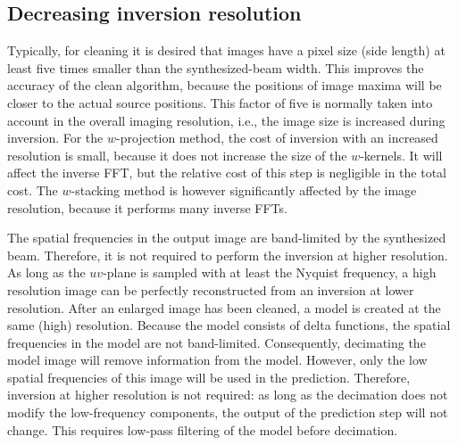 \documentclass[useAMS,usenatbib]{mn2e}
\begin{document}
\subsection{Decreasing inversion resolution} \label{sec:decreasing-inversion-resolution}
Typically, for cleaning it is desired that images have a pixel size (side length) at least five times smaller than the synthesized-beam width. This improves the accuracy of the clean algorithm, because the positions of image maxima will be closer to the actual source positions. This factor of five is normally taken into account in the overall imaging resolution, i.e., the image size is increased during inversion. For the $w$-projection method, the cost of inversion with an increased resolution is small, because it does not increase the size of the $w$-kernels. It will affect the inverse FFT, but the relative cost of this step is negligible in the total cost. The $w$-stacking method is however significantly affected by the image resolution, because it performs many inverse FFTs.

The spatial frequencies in the output image are band-limited by the synthesized beam. Therefore, it is not required to perform the inversion at higher resolution. As long as the $uv$-plane is sampled with at least the Nyquist frequency, a high resolution image can be perfectly reconstructed from an inversion at lower resolution. After an enlarged image has been cleaned, a model is created at the same (high) resolution. Because the model consists of delta functions, the spatial frequencies in the model are not band-limited. Consequently, decimating the model image will remove information from the model. However, only the low spatial frequencies of this image will be used in the prediction. Therefore, inversion at higher resolution is not required: as long as the decimation does not modify the low-frequency components, the output of the prediction step will not change. This requires low-pass filtering of the model before decimation.
\end{document}
